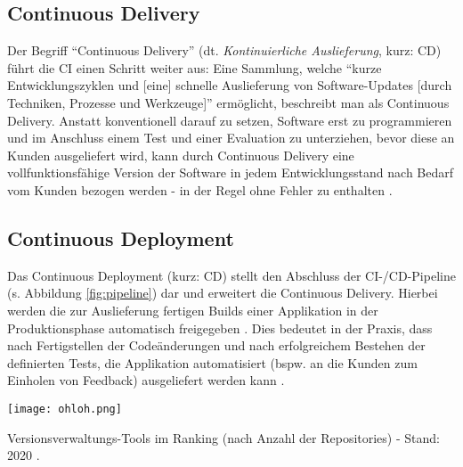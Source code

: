 \subsection{Continuous Delivery}
Der Begriff \enquote{Continuous Delivery} (dt. \textit{Kontinuierliche Auslieferung}, kurz: CD) führt die CI einen Schritt weiter aus: Eine Sammlung, welche \enquote{kurze Entwicklungszyklen und [eine] schnelle Auslieferung von Software-Updates [durch Techniken, Prozesse und Werkzeuge]} \cite{Ilanrr:2017aa}
ermöglicht, beschreibt man als Continuous Delivery. Anstatt konventionell darauf zu setzen, Software erst zu programmieren und im Anschluss einem Test und einer Evaluation zu unterziehen, bevor diese an Kunden ausgeliefert wird, kann durch Continuous Delivery eine vollfunktionsfähige Version der Software
in jedem Entwicklungsstand nach Bedarf vom Kunden bezogen werden - in der Regel ohne Fehler zu enthalten \cite{Ilanrr:2017aa}.

\subsection{Continuous Deployment}
Das Continuous Deployment (kurz: CD) stellt den Abschluss der CI-/CD-Pipeline (s. Abbildung \ref{fig:pipeline}) dar und erweitert die Continuous Delivery. Hierbei werden die zur Auslieferung fertigen Builds einer Applikation in der Produktionsphase automatisch freigegeben \cite{RedHat:2020aa}. Dies bedeutet in der Praxis,
dass nach Fertigstellen der Codeänderungen und nach erfolgreichem Bestehen der definierten Tests, die Applikation automatisiert (bspw. an die Kunden zum Einholen von Feedback) ausgeliefert werden kann \cite{RedHat:2020aa}.

\begin{marginfigure}
    \texttt{[image: ohloh.png]}
    \caption{\label{fig:ohloh}Versionsverwaltungs-Tools im Ranking (nach Anzahl der Repositories) - Stand: 2020 \cite{Hub:2020aa}.}
\end{marginfigure}
